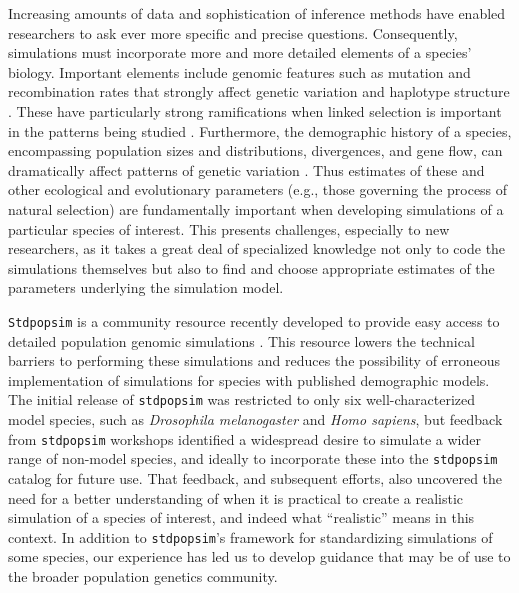 \documentclass[hidelinks]{article}
\newcommand{\Stdpopsim}{\texttt{Stdpopsim}\xspace}
\newcommand{\stdpopsim}{\texttt{stdpopsim}\xspace}
\begin{document}
Increasing amounts of data and sophistication of inference methods
have enabled researchers to ask ever more
specific and precise questions. Consequently, simulations must incorporate
more and more detailed elements of a species' biology.
Important elements include genomic features such as mutation and recombination
rates that strongly affect genetic variation and haplotype structure
\citep{Nachman2002}. These have particularly strong ramifications 
when linked selection is important in the patterns being studied \citep{Cutter2013}.
Furthermore, the demographic history of a species,
encompassing population sizes and distributions, divergences, and gene flow, can
dramatically affect patterns of genetic variation \citep{Teshima2006}. Thus
estimates of these and other ecological and evolutionary parameters (e.g., those governing
the process of natural selection) are fundamentally important when
developing simulations of a particular species of interest.
This presents challenges, especially to new researchers,
as it takes a great deal of specialized knowledge not only to code the simulations themselves
but also to find and choose appropriate estimates of the parameters underlying the simulation model.

\Stdpopsim is a community resource recently developed to provide easy
access to detailed population genomic simulations \citep{Adrion2020}. This
resource lowers the technical barriers to performing these simulations
and reduces the possibility of erroneous implementation of simulations
for species with published demographic models. 
The initial release of \stdpopsim was
restricted to only six well-characterized model species, such as
\emph{Drosophila melanogaster} and \emph{Homo sapiens},
but feedback from \stdpopsim workshops identified a widespread desire
to simulate a wider range of non-model species,
and ideally to incorporate these into the \stdpopsim catalog for future use.
That feedback, and subsequent efforts, also uncovered the need for a 
better understanding of when it is practical to create a realistic
simulation of a species of interest, and indeed what ``realistic'' means in this context.
In addition to \stdpopsim's framework for standardizing simulations of some species,
our experience has led us to develop guidance that may be of use to
the broader population genetics community.
\end{document}
